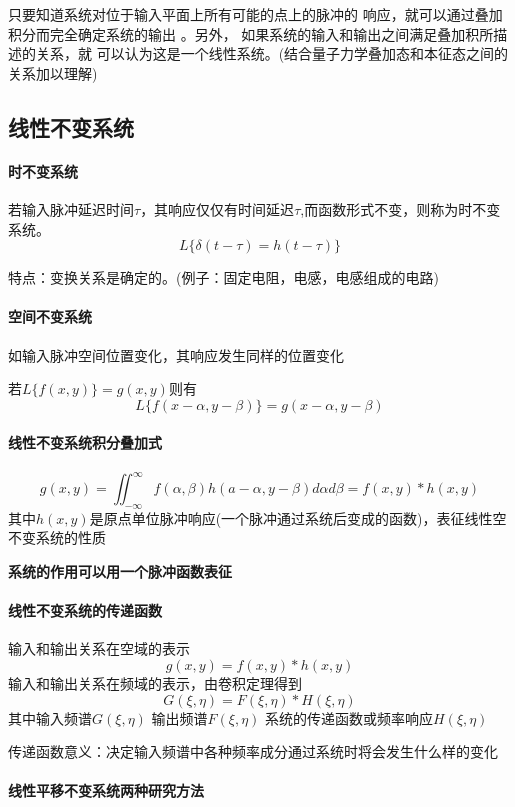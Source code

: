\documentclass[UTF8]{ctexart}
\begin{document}
只要知道系统对位于输入平面上所有可能的点上的脉冲的
响应，就可以通过叠加积分而完全确定系统的输出 。另外，
如果系统的输入和输出之间满足叠加积所描述的关系，就
可以认为这是一个线性系统。(结合量子力学叠加态和本征态之间的关系加以理解)
\subsection{线性不变系统}
\paragraph{时不变系统}若输入脉冲延迟时间$\tau$，其响应仅仅有时间延迟$\tau$,而函数形式不变，则称为时不变系统。
\[
    L\{\delta(t-\tau)=h(t-\tau)
        \}\]

        特点：变换关系是确定的。(例子：固定电阻，电感，电感组成的电路)

\paragraph{空间不变系统}
如输入脉冲空间位置变化，其响应发生同样的位置变化

若$L\{f(x,y)\}=g(x,y)$则有
\[L\{f(x-\alpha,y-\beta)\}
=g(x-\alpha,y-\beta)
    \]
    \paragraph{线性不变系统积分叠加式}\[
        g(x,y)=\iint_{-\infty}^{\infty}f(\alpha,\beta)h(a-\alpha,y-\beta)d\alpha d\beta
        =f(x,y)*h(x,y)
        \]
        其中$h(x,y)$是原点单位脉冲响应(一个脉冲通过系统后变成的函数)，表征线性空不变系统的性质

        \textbf{系统的作用可以用一个脉冲函数表征}
\paragraph{线性不变系统的传递函数}输入和输出关系在空域的表示
\[
    g(x,y)=f(x,y)*h(x,y)
    \]
    输入和输出关系在频域的表示，由卷积定理得到
    \[
        G(\xi,\eta)=F(\xi,\eta)*H(\xi,\eta)
    \]
其中输入频谱$G(\xi,\eta)$
    输出频谱$F(\xi,\eta)$
    系统的传递函数或频率响应$H(\xi,\eta)$
    
    传递函数意义：决定输入频谱中各种频率成分通过系统时将会发生什么样的变化
    
\paragraph{线性平移不变系统两种研究方法}
\end{document}
